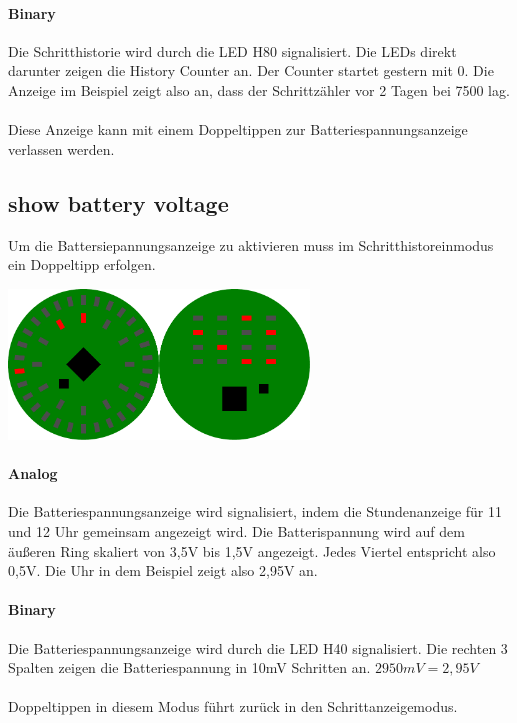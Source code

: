 \paragraph{Binary}
Die Schritthistorie wird durch die LED H80 signalisiert.
Die LEDs direkt darunter zeigen die History Counter an. Der Counter startet gestern mit 0.
Die Anzeige im Beispiel zeigt also an, dass der Schrittzähler vor 2 Tagen bei 7500 lag.\\
\\
Diese Anzeige kann mit einem Doppeltippen zur Batteriespannungsanzeige verlassen werden.
\subsection{show battery voltage}
Um die Battersiepannungsanzeige zu aktivieren muss im Schritthistoreinmodus ein Doppeltipp erfolgen.
\begin{center}
\includegraphics[width=0.6\textwidth]{../Graphics/ShowUBatt_2950mV}
\end{center}
\paragraph{Analog}
Die Batteriespannungsanzeige wird signalisiert, indem die Stundenanzeige für 11 und 12 Uhr gemeinsam angezeigt wird.
Die Batterispannung wird auf dem äußeren Ring skaliert von 3,5V bis 1,5V angezeigt. Jedes Viertel entspricht also 0,5V.
Die Uhr in dem Beispiel zeigt also 2,95V an.

\paragraph{Binary}
Die Batteriespannungsanzeige wird durch die LED H40 signalisiert.
Die rechten 3 Spalten zeigen die Batteriespannung in 10mV Schritten an.
$2950mV=2,95V$\\
\\
Doppeltippen in diesem Modus führt zurück in den Schrittanzeigemodus.